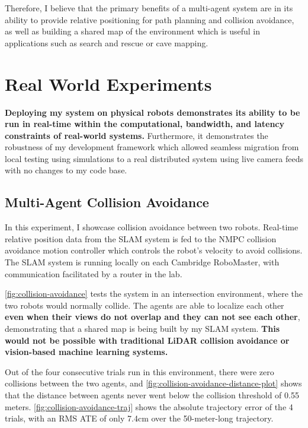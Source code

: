 Therefore, I believe that the primary benefits of a multi-agent system are in its ability to provide relative positioning for path planning and collision avoidance, as well as building a shared map of the environment which is useful in applications such as search and rescue or cave mapping.


\section{Real World Experiments}
\label{sec:real-world-experiments}
\textbf{Deploying my system on physical robots demonstrates its ability to be run in real-time within the computational, bandwidth, and latency constraints of real-world systems.} Furthermore, it demonstrates the robustness of my development framework which allowed seamless migration from local testing using simulations to a real distributed system using live camera feeds with no changes to my code base.

\subsection{Multi-Agent Collision Avoidance}
\label{sec:multi-agent-collision-avoidance}
In this experiment, I showcase collision avoidance between two robots. Real-time relative position data from the SLAM system is fed to the NMPC collision avoidance motion controller which controls the robot's velocity to avoid collisions. The SLAM system is running locally on each Cambridge RoboMaster, with communication facilitated by a router in the lab.

\autoref{fig:collision-avoidance} tests the system in an intersection environment, where the two robots would normally collide. The agents are able to localize each other \textbf{even when their views do not overlap and they can not see each other}, demonstrating that a shared map is being built by my SLAM system. \textbf{This would not be possible with traditional LiDAR collision avoidance or vision-based machine learning systems.}


Out of the four consecutive trials run in this environment, there were zero collisions between the two agents, and \autoref{fig:collision-avoidance-distance-plot} shows that the distance between agents never went below the collision threshold of 0.55 meters. \autoref{fig:collision-avoidance-traj} shows the absolute trajectory error of the 4 trials, with an RMS ATE of only 7.4cm over the 50-meter-long trajectory.


